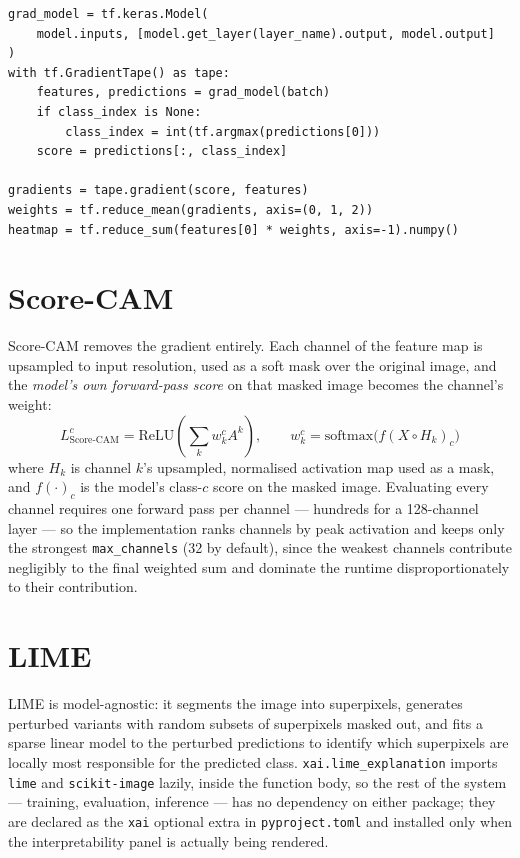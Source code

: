\documentclass[11pt,a4paper,oneside]{report}
\newcommand{\code}[1]{\texttt{\small #1}}
\begin{document}
\begin{lstlisting}[caption={Grad-CAM implementation
(\texttt{lxnet/xai.py}).}, label=lst:gradcam]
grad_model = tf.keras.Model(
    model.inputs, [model.get_layer(layer_name).output, model.output]
)
with tf.GradientTape() as tape:
    features, predictions = grad_model(batch)
    if class_index is None:
        class_index = int(tf.argmax(predictions[0]))
    score = predictions[:, class_index]

gradients = tape.gradient(score, features)
weights = tf.reduce_mean(gradients, axis=(0, 1, 2))
heatmap = tf.reduce_sum(features[0] * weights, axis=-1).numpy()
\end{lstlisting}

\section{Score-CAM}

Score-CAM \cite{wang2020} removes the gradient entirely. Each channel of the
feature map is upsampled to input resolution, used as a soft mask over the
original image, and the \emph{model's own forward-pass score} on that masked
image becomes the channel's weight:
\begin{equation}
L^c_{\text{Score-CAM}} = \mathrm{ReLU}\!\left( \sum_k w_k^c A^k \right),
\qquad w_k^c = \mathrm{softmax}\big(f(X \circ H_k)_c\big)
\label{eq:scorecam}
\end{equation}
where $H_k$ is channel $k$'s upsampled, normalised activation map used as a
mask, and $f(\cdot)_c$ is the model's class-$c$ score on the masked image.
Evaluating every channel requires one forward pass per channel --- hundreds
for a 128-channel layer --- so the implementation ranks channels by peak
activation and keeps only the strongest \code{max\_channels} (32 by default),
since the weakest channels contribute negligibly to the final weighted sum
and dominate the runtime disproportionately to their contribution.

\section{LIME}

LIME \cite{ribeiro2016} is model-agnostic: it segments the image into
superpixels, generates perturbed variants with random subsets of superpixels
masked out, and fits a sparse linear model to the perturbed predictions to
identify which superpixels are locally most responsible for the predicted
class. \code{xai.lime\_explanation} imports \code{lime} and
\code{scikit-image} lazily, inside the function body, so the rest of the
system --- training, evaluation, inference --- has no dependency on either
package; they are declared as the \code{xai} optional extra in
\texttt{pyproject.toml} and installed only when the interpretability panel is
actually being rendered.
\end{document}
